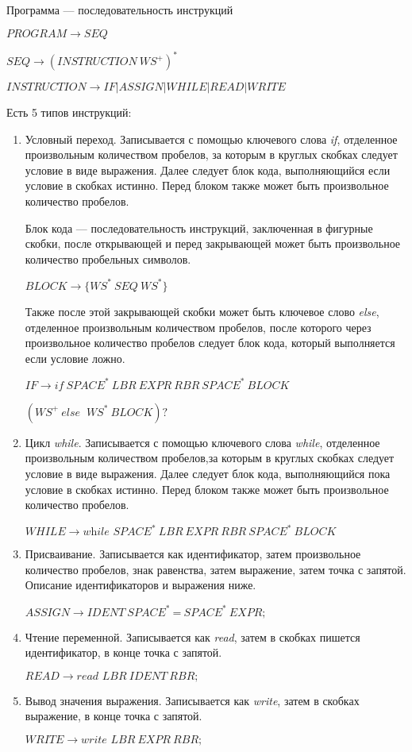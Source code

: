 \documentclass[14pt]{extarticle}
\begin{document}
Программа --- последовательность инструкций

$PROGRAM \to SEQ$

$SEQ \to (INSTRUCTION\ WS^+)^*$

$INSTRUCTION \to IF | ASSIGN | WHILE | READ | WRITE$

Есть 5 типов инструкций:
\begin{enumerate}
    \item Условный переход. Записывается с помощью ключевого слова \textit{if}, отделенное
          произвольным количеством пробелов, за которым в круглых
          скобках следует условие в виде выражения. Далее следует блок кода, выполняющийся если условие
          в скобках истинно. Перед блоком также может быть произвольное количество пробелов.

          Блок кода --- последовательность инструкций, заключенная в фигурные скобки, после
          открывающей и перед закрывающей может быть произвольное количество пробельных символов.

          $BLOCK \to \{WS ^ *\ SEQ\ WS ^*\}$

          Также после этой закрывающей скобки может быть ключевое слово \textit{else}, отделенное
          произвольным количеством пробелов, после которого через произвольное количество пробелов
          следует блок кода, который выполняется если условие ложно.

          $IF \to \textit{if}\ SPACE^*\ LBR\ EXPR\ RBR \ SPACE^*\ BLOCK$

          $(WS^+\ \textit{else }\ WS ^* \ BLOCK)?$

    \item Цикл \textit{while}. Записывается с помощью ключевого слова \textit{while}, отделенное
          произвольным количеством пробелов,за которым в круглых
          скобках следует условие в виде выражения. Далее следует блок кода, выполняющийся пока условие
          в скобках истинно. Перед блоком также может быть произвольное количество пробелов.

          $WHILE \to \textit{while } SPACE ^ *\ LBR\ EXPR\ RBR \ SPACE ^ *\ BLOCK$

    \item Присваивание. Записывается как идентификатор, затем произвольное количество пробелов, знак
          равенства, затем выражение, затем точка с запятой. Описание идентификаторов и выражения ниже.

          $ASSIGN \to IDENT\ SPACE^*\ \textbf{=}\ SPACE^*\ EXPR\text{;}$

    \item Чтение переменной. Записывается как \textit{read}, затем в скобках пишется идентификатор, в
          конце точка с запятой.

          $READ \to \textit{read } LBR\ IDENT \ RBR \text{;}$

    \item Вывод значения выражения. Записывается как \textit{write}, затем в скобках выражение, в
          конце точка с запятой.

          $WRITE \to \textit{write } LBR\ EXPR \ RBR \text{;}$
\end{enumerate}
\end{document}
